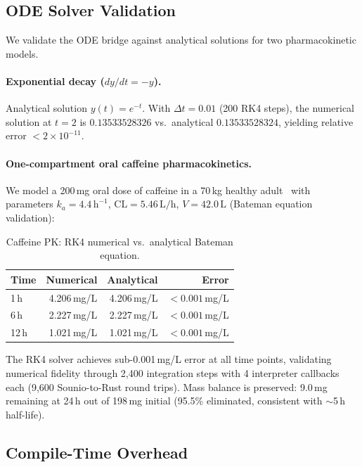 \documentclass[acmsmall,screen,review,anonymous]{acmart}
\begin{document}
\subsection{ODE Solver Validation}

We validate the ODE bridge against analytical solutions for two
pharmacokinetic models.

\paragraph{Exponential decay ($dy/dt = -y$).}
Analytical solution $y(t) = e^{-t}$.
With $\Delta t = 0.01$ (200 RK4 steps), the numerical solution
at $t = 2$ is $0.13533528326$ vs.\ analytical $0.13533528324$,
yielding relative error $< 2 \times 10^{-11}$.

\paragraph{One-compartment oral caffeine pharmacokinetics.}
We model a 200\,mg oral dose of caffeine in a 70\,kg healthy
adult~\cite{grzegorzewski2022caffeine} with parameters
$k_a = 4.4\,\text{h}^{-1}$, $\text{CL} = 5.46\,\text{L/h}$,
$V = 42.0\,\text{L}$ (Bateman equation validation):

\begin{table}[t]
\centering
\caption{Caffeine PK: RK4 numerical vs.\ analytical Bateman equation.}
\label{tab:caffeine}
\begin{tabular}{lrrr}
\toprule
Time & Numerical & Analytical & Error \\
\midrule
1\,h   & 4.206\,mg/L & 4.206\,mg/L & $< 0.001$\,mg/L \\
6\,h   & 2.227\,mg/L & 2.227\,mg/L & $< 0.001$\,mg/L \\
12\,h  & 1.021\,mg/L & 1.021\,mg/L & $< 0.001$\,mg/L \\
\bottomrule
\end{tabular}
\end{table}

\noindent
The RK4 solver achieves sub-0.001\,mg/L error at all time points,
validating numerical fidelity through 2{,}400 integration steps with
4 interpreter callbacks each (9{,}600 Sounio-to-Rust round trips).
Mass balance is preserved: 9.0\,mg remaining at 24\,h out of
198\,mg initial (95.5\% eliminated, consistent with $\sim$5\,h half-life).

\subsection{Compile-Time Overhead}
\end{document}
